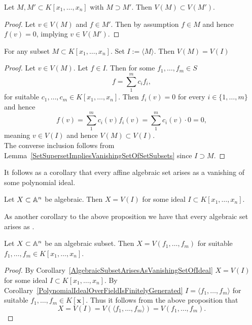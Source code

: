 \begin{lemma}\label{SetSupersetImpliesVanishingSetOfSetSubsets}
    Let $M,M'\subset K[x_1,\dots,x_n]$ with $M\supset M'$. Then $V(M)\subset V(M')$.
\end{lemma}
\begin{proof}
    Let $v\in V(M)$ and $f\in M'$. Then by assumption $f\in M$ and hence $f(v)=0$, implying $v\in V(M')$. 
\end{proof}
\begin{proposition}\label{EveryVanishingSetIsAVanishingSetOverIdeal}
    For any subset $M\subset K[x_1,\dots,x_n]$. Set $I:= \langle M\rangle$. Then $V(M)=V(I)$
\end{proposition}
\begin{proof}
    Let $v\in V(M)$. Let $f\in I$. Then for some $f_1,\dots,f_m\in S$ 
    $$f = \sum_1^m c_if_i,$$
    for suitable $c_1,\dots,c_m\in K[x_1,\dots,x_n]$. Then $f_i(v) = 0$ for every $i\in\{1,\dots,m\}$ and hence 
    $$f(v)=\sum_1^m c_i(v)f_i(v) = \sum_1^m c_i(v)\cdot 0 = 0,$$
    meaning $v\in V(I)$ and hence $V(M)\subset V(I)$.\\
    The converse inclusion follows from Lemma~\ref{SetSupersetImpliesVanishingSetOfSetSubsets} since $I\supset M$.  
\end{proof}
It follows as a corollary that every affine algebraic set arises as a vanishing of some polynomial ideal.
\begin{corollary}\label{AlgebraicSubsetArisesAsVanishingSetOfIdeal}
    Let $X\subset \mathbb{A}^n$ be algebraic. Then $X=V(I)$ for some ideal $I\subset K[x_1,\dots,x_n]$.
\end{corollary}
As another corollary to the above proposition we have that every algebraic set arises as . 
\begin{corollary}\label{AlgebraicSubsetArisesAsVanishingSetOfFiniteSet}
    Let $X\subset \mathbb{A}^n$ be an algebraic subset. Then $X = V(f_1,\dots,f_m)$ for suitable $f_1,\dots,f_m\in K[x_1,\dots,x_n]$.
\end{corollary}
\begin{proof}
    By Corollary~\ref{AlgebraicSubsetArisesAsVanishingSetOfIdeal} $X=V(I)$ for some ideal $I\subset K[x_1,\dots,x_n]$. By Corollary~\ref{PolynomialIdealOverFieldIsFinitelyGenerated} $I=\langle f_1,\dots,f_m\rangle$ for suitable $f_1,\dots,f_m\in K[\mathbf{x}]$. Thus it follows from the above proposition that
    $$X= V(I) = V(\langle f_1,\dots,f_m\rangle)= V(f_1,\dots,f_m).$$
\end{proof}

